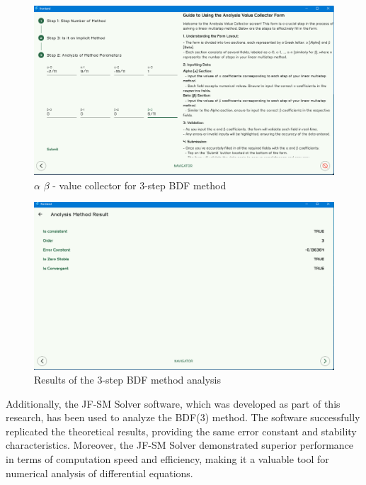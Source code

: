 \documentclass[a4paper, twoside]{report} %
\begin{document}
	\begin{figure}[htbp]
		\centering
		\includegraphics[width=1\textwidth]{chapters/4/image/5.png}
		\caption{$\alpha$ $\beta$ - value collector for 3-step BDF method}
	\end{figure}

	\begin{figure}[htbp]
		\centering
		\includegraphics[width=1\textwidth]{chapters/4/image/6.png}
		\caption{Results of the 3-step BDF method analysis}
	\end{figure}



	Additionally, the JF-SM Solver software, which was developed as part of this research, has been used to analyze the BDF(3) method. The software successfully replicated the theoretical results, providing the same error constant and stability characteristics. Moreover, the JF-SM Solver demonstrated superior performance in terms of computation speed and efficiency, making it a valuable tool for numerical analysis of differential equations.


\end{document}
